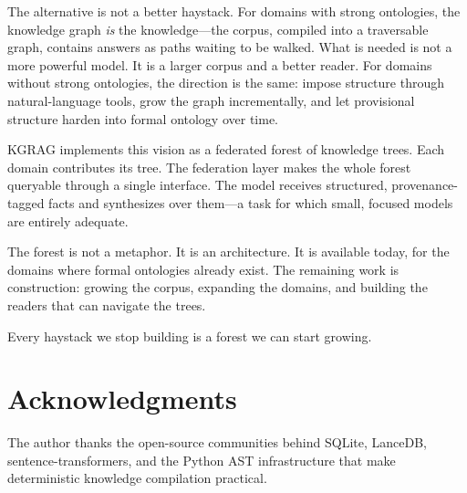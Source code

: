 \documentclass{article}
\begin{document}
The alternative is not a better haystack.  For domains with strong ontologies,
the knowledge graph \emph{is} the knowledge---the corpus, compiled into a
traversable graph, contains answers as paths waiting to be walked.  What is
needed is not a more powerful model.  It is a larger corpus and a better reader.
For domains without strong ontologies, the direction is the same: impose
structure through natural-language tools, grow the graph incrementally, and let
provisional structure harden into formal ontology over time.

KGRAG implements this vision as a federated forest of knowledge trees.  Each
domain contributes its tree.  The federation layer makes the whole forest
queryable through a single interface.  The model receives structured,
provenance-tagged facts and synthesizes over them---a task for which small,
focused models are entirely adequate.

The forest is not a metaphor.  It is an architecture.  It is available today,
for the domains where formal ontologies already exist.  The remaining work is
construction: growing the corpus, expanding the domains, and building the readers
that can navigate the trees.

Every haystack we stop building is a forest we can start growing.

\section*{Acknowledgments}

The author thanks the open-source communities behind SQLite, LanceDB,
sentence-transformers, and the Python AST infrastructure that make deterministic
knowledge compilation practical.
\end{document}
